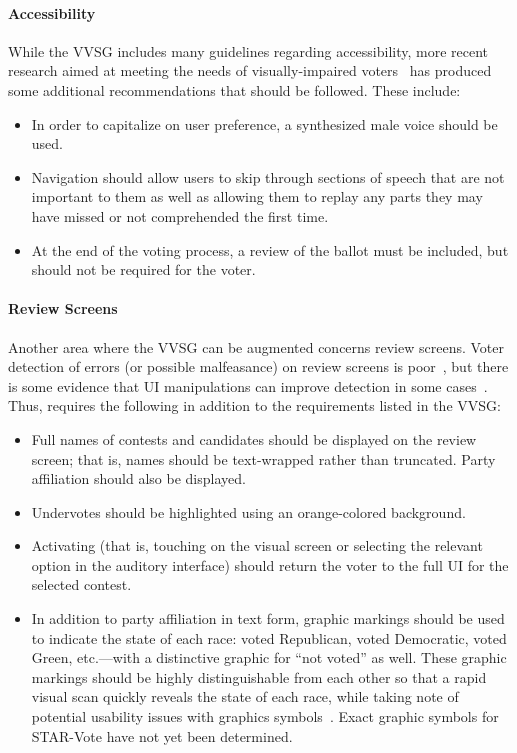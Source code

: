 \paragraph{Accessibility}
While the VVSG includes many guidelines regarding accessibility, more recent research aimed at meeting the needs of visually-impaired voters~\cite{piner-11} has produced some additional recommendations that should be followed. These include:
\begin{itemize}
\item  In order  to capitalize on user preference, a synthesized male voice should be used.
\item Navigation should allow users to skip through sections of speech that are not important to them as well as allowing them to replay any parts they may have missed or not comprehended the first time.
\item At the end of the voting process, a review of the ballot must be included, but should not be required for the voter. 
\end{itemize}

\paragraph{Review Screens}
Another area where the VVSG can be augmented concerns review screens. 
Voter detection of errors (or possible malfeasance) on review screens is poor~\cite{everett07thesis}, but there is some evidence that UI manipulations can improve detection in some cases~\cite{campbell-evt09}. Thus, \projname  requires the following in addition to the requirements listed in the VVSG:
\begin{itemize}
\item  Full names of contests and candidates should be displayed on the review screen; that is, names should be text-wrapped rather than truncated. 
Party affiliation should also be displayed.
\item Undervotes should be highlighted using an orange-colored background. 
\item Activating (that is, touching on the visual screen or selecting the relevant option in the auditory interface) should return the voter to the full UI for the selected contest.
\item In addition to party affiliation in text form, graphic markings should be used to indicate the state of each race: voted Republican, voted Democratic, voted Green, etc.---with a distinctive graphic for ``not voted'' as well. These graphic markings should be highly distinguishable from each other so that a rapid visual scan quickly reveals the state of each race, while taking note of potential usability issues with graphics symbols~\cite{laskowski-symbols}.  Exact graphic symbols for STAR-Vote have not yet been determined.
\end{itemize}

